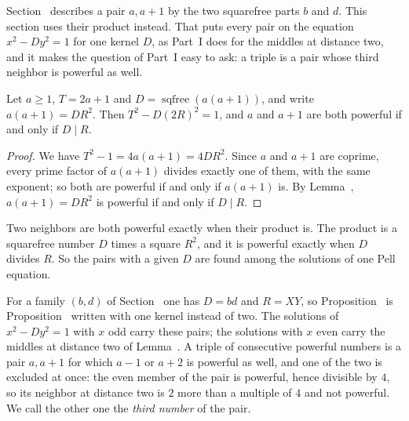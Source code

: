 Section~ describes a pair $a, a + 1$ by the two squarefree parts $b$ and $d$. This section uses their product instead. That
puts every pair on the equation $x^2 - Dy^2 = 1$ for one kernel $D$, as Part~I does for the middles at distance two, and it makes the
question of Part~I easy to ask: a triple is a pair whose third neighbor is powerful as well.

\begin{proposition}
Let $a \ge 1$, $T = 2a + 1$ and $D = \operatorname{sqfree}(a(a + 1))$, and write $a(a + 1) = D R^2$. Then $T^2 - D(2R)^2 = 1$, and $a$ and
$a + 1$ are both powerful if and only if $D \mid R$.
\end{proposition}

\begin{proof}
We have $T^2 - 1 = 4a(a + 1) = 4DR^2$. Since $a$ and $a + 1$ are coprime, every prime factor of $a(a + 1)$ divides exactly one of them, with
the same exponent; so both are powerful if and only if $a(a + 1)$ is. By Lemma~, $a(a + 1) = DR^2$ is powerful if and only if
$D \mid R$.
\end{proof}

\inwords Two neighbors are both powerful exactly when their product is. The product is a squarefree number $D$ times a square $R^2$, and it is
powerful exactly when $D$ divides $R$. So the pairs with a given $D$ are found among the solutions of one Pell equation.

For a family $(b, d)$ of Section~ one has $D = bd$ and $R = XY$, so Proposition~ is
Proposition~ written with one kernel instead of two. The solutions of $x^2 - Dy^2 = 1$ with $x$ odd carry these pairs; the
solutions with $x$ even carry the middles at distance two of Lemma~. A triple of consecutive powerful numbers is a
pair $a, a + 1$ for which $a - 1$ or $a + 2$ is powerful as well, and one of the two is excluded at once: the even member of the pair is
powerful, hence divisible by $4$, so its neighbor at distance two is $2$ more than a multiple of $4$ and not powerful. We call the other one
the \emph{third number} of the pair.

